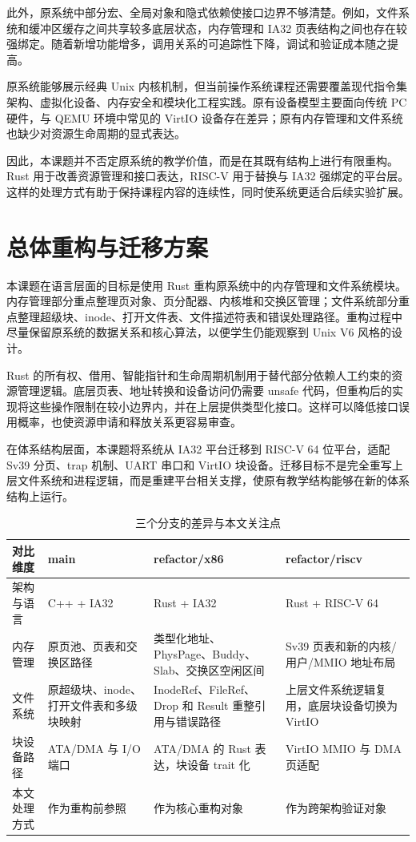 此外，原系统中部分宏、全局对象和隐式依赖使接口边界不够清楚。例如，文件系统和缓冲区缓存之间共享较多底层状态，内存管理和 IA32 页表结构之间也存在较强绑定。随着新增功能增多，调用关系的可追踪性下降，调试和验证成本随之提高。

原系统能够展示经典 Unix 内核机制，但当前操作系统课程还需要覆盖现代指令集架构、虚拟化设备、内存安全和模块化工程实践。原有设备模型主要面向传统 PC 硬件，与 QEMU 环境中常见的 VirtIO 设备存在差异；原有内存管理和文件系统也缺少对资源生命周期的显式表达。

因此，本课题并不否定原系统的教学价值，而是在其既有结构上进行有限重构。Rust 用于改善资源管理和接口表达，RISC-V 用于替换与 IA32 强绑定的平台层。这样的处理方式有助于保持课程内容的连续性，同时使系统更适合后续实验扩展。

\section{总体重构与迁移方案}

本课题在语言层面的目标是使用 Rust 重构原系统中的内存管理和文件系统模块。内存管理部分重点整理页对象、页分配器、内核堆和交换区管理；文件系统部分重点整理超级块、inode、打开文件表、文件描述符表和错误处理路径。重构过程中尽量保留原系统的数据关系和核心算法，以便学生仍能观察到 Unix V6 风格的设计。

Rust 的所有权、借用、智能指针和生命周期机制用于替代部分依赖人工约束的资源管理逻辑。底层页表、地址转换和设备访问仍需要 unsafe 代码，但重构后的实现将这些操作限制在较小边界内，并在上层提供类型化接口。这样可以降低接口误用概率，也使资源申请和释放关系更容易审查。

在体系结构层面，本课题将系统从 IA32 平台迁移到 RISC-V 64 位平台，适配 Sv39 分页、trap 机制、UART 串口和 VirtIO 块设备。迁移目标不是完全重写上层文件系统和进程逻辑，而是重建平台相关支撑，使原有教学结构能够在新的体系结构上运行。

\begin{table}[htbp]
  \centering
  \caption{三个分支的差异与本文关注点}\label{tab:branch-focus}
  \begin{tabular}{p{}p{}p{}p{}}
    \toprule
    \textbf{对比维度} & \textbf{main} & \textbf{refactor/x86} & \textbf{refactor/riscv} \\
    \midrule
    架构与语言 & C++ + IA32 & Rust + IA32 & Rust + RISC-V 64 \\
    内存管理 & 原页池、页表和交换区路径 & 类型化地址、PhysPage、Buddy、Slab、交换区空闲区间 & Sv39 页表和新的内核/用户/MMIO 地址布局 \\
    文件系统 & 原超级块、inode、打开文件表和多级块映射 & InodeRef、FileRef、Drop 和 Result 重整引用与错误路径 & 上层文件系统逻辑复用，底层块设备切换为 VirtIO \\
    块设备路径 & ATA/DMA 与 I/O 端口 & ATA/DMA 的 Rust 表达，块设备 trait 化 & VirtIO MMIO 与 DMA 页适配 \\
    本文处理方式 & 作为重构前参照 & 作为核心重构对象 & 作为跨架构验证对象 \\
    \bottomrule
  \end{tabular}
\end{table}
